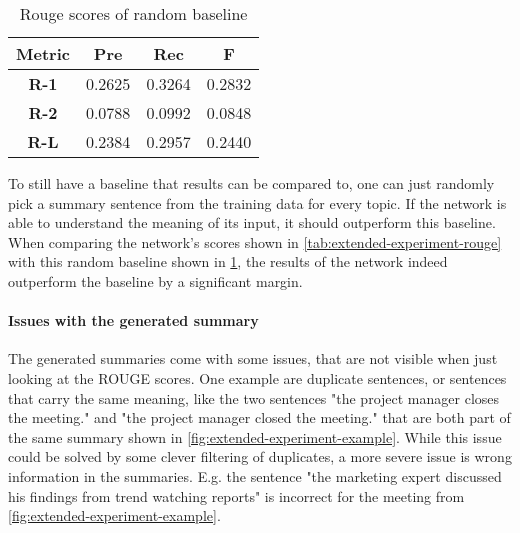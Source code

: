\begin{table}[h]
\centering
\begin{tabular}{@{}clll@{}}
\toprule
\textbf{Metric} & \multicolumn{1}{c}{\textbf{Pre}} & \multicolumn{1}{c}{\textbf{Rec}} & \multicolumn{1}{c}{\textbf{F}} \\ \midrule
\textbf{R-1}    & 0.2625                           & 0.3264                           & 0.2832                         \\
\textbf{R-2}    & 0.0788                           & 0.0992                           & 0.0848                         \\
\textbf{R-L}    & 0.2384                           & 0.2957                           & 0.2440                         \\ \bottomrule
\end{tabular}
\caption{Rouge scores of random baseline}
\label{tab:extended-experiment-rouge-random}
\end{table}

To still have a baseline that results can be compared to, one can just randomly pick a summary sentence from the training data for every topic.
If the network is able to understand the meaning of its input, it should outperform this baseline.
When comparing the network's scores shown in \cref{tab:extended-experiment-rouge} with this random baseline shown in \cref{tab:extended-experiment-rouge-random}, the results of the network indeed outperform the baseline by a significant margin.

\paragraph{Issues with the generated summary}

The generated summaries come with some issues, that are not visible when just looking at the ROUGE scores.
One example are duplicate sentences, or sentences that carry the same meaning, like the two sentences "the project manager closes the meeting." and "the project manager closed the meeting." that are both part of the same summary shown in \cref{fig:extended-experiment-example}.
While this issue could be solved by some clever filtering of duplicates, a more severe issue is wrong information in the summaries.
E.g. the sentence "the marketing expert discussed his findings from trend watching reports" is incorrect for the meeting from \cref{fig:extended-experiment-example}.